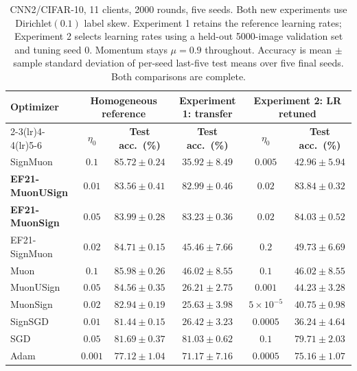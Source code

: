 \begin{table}[!t]
\centering
\footnotesize
\setlength{\tabcolsep}{5pt}
\renewcommand{\arraystretch}{1.1}
\begin{tabular}{@{}lccccc@{}}
\toprule
\multirow{2}{*}{\textbf{Optimizer}} &
\multicolumn{2}{c}{\textbf{Homogeneous reference}} &
\textbf{Experiment 1: transfer} &
\multicolumn{2}{c}{\textbf{Experiment 2: LR retuned}} \\
\cmidrule(lr){2-3}\cmidrule(lr){4-4}\cmidrule(lr){5-6}
& $\eta_0$ & \textbf{Test acc.\ (\%)} & \textbf{Test acc.\ (\%)} &
$\eta_0$ & \textbf{Test acc.\ (\%)} \\
\midrule
SignMuon & $0.1$ & $85.72\pm0.24$ & $35.92\pm8.49$ & $0.005$ & $42.96\pm5.94$ \\
\textbf{EF21-MuonUSign} & $0.01$ & $83.56\pm0.41$ & $\mathbf{82.99\pm0.46}$ & $0.02$ & $\mathbf{83.84\pm0.32}$ \\
\textbf{EF21-MuonSign} & $0.05$ & $83.99\pm0.28$ & $\mathbf{83.23\pm0.36}$ & $0.02$ & $\mathbf{84.03\pm0.52}$ \\
EF21-SignMuon & $0.02$ & $84.71\pm0.15$ & $45.46\pm7.66$ & $0.2$ & $49.73\pm6.69$ \\
Muon & $0.1$ & $85.98\pm0.26$ & $46.02\pm8.55$ & $0.1$ & $46.02\pm8.55$ \\
MuonUSign & $0.05$ & $84.56\pm0.35$ & $26.21\pm2.75$ & $0.001$ & $44.23\pm3.28$ \\
MuonSign & $0.02$ & $82.94\pm0.19$ & $25.63\pm3.98$ & $5\times10^{-5}$ & $40.75\pm0.98$ \\
SignSGD & $0.01$ & $81.44\pm0.15$ & $26.42\pm3.23$ & $0.0005$ & $36.24\pm4.64$ \\
SGD & $0.05$ & $81.69\pm0.37$ & $81.03\pm0.62$ & $0.1$ & $79.71\pm2.03$ \\
Adam & $0.001$ & $77.12\pm1.04$ & $71.17\pm7.16$ & $0.0005$ & $75.16\pm1.07$ \\
\bottomrule
\end{tabular}
\caption{CNN2/CIFAR-10, 11 clients, 2000 rounds, five seeds. Both new
experiments use Dirichlet$(0.1)$ label skew. Experiment 1 retains the
reference learning rates; Experiment 2 selects learning rates using a held-out
5000-image validation set and tuning seed 0. Momentum stays $\mu=0.9$
throughout. Accuracy is mean $\pm$ sample standard deviation of per-seed
last-five test means over five final seeds. Both comparisons are complete.}
\label{add:tab:heterogeneous}
\end{table}

